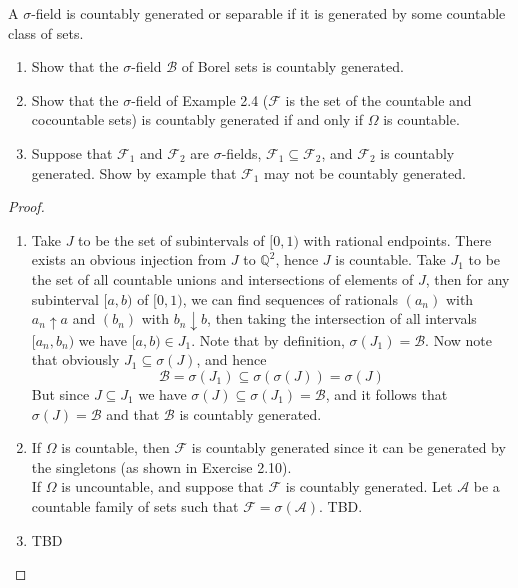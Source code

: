 \documentclass[12pt]{article}
\newcommand{\Q}{\mathbb{Q}}
\newcommand{\F}{\mathcal{F}}
\newcommand{\A}{\mathcal{A}}
\newcommand{\B}{\mathcal{B}}
\newcommand{\seq}{\subseteq}
\newcommand{\Om}{\Omega}
\newenvironment{exercise}[2][Exercise]{\begin{trivlist}
\item[\hskip \labelsep {\bfseries #1}\hskip \labelsep {\bfseries #2.}]}{\end{trivlist}}
\begin{document}
\begin{exercise}{2.11}
    A $\sigma$-field is countably generated or separable if it is generated by some countable class of sets.
    \begin{enumerate}
        \item Show that the $\sigma$-field $\B$ of Borel sets is countably generated.
        \item Show that the $\sigma$-field of Example 2.4 ($\F$ is the set of the countable and cocountable sets) is countably generated if and only if $\Om$ is countable.
        \item Suppose that $\F_1$ and $\F_2$ are $\sigma$-fields, $\F_1 \seq \F_2$, and $\F_2$ is countably generated. Show by example that $\F_1$ may not be countably generated.
    \end{enumerate}
\end{exercise}
\begin{proof}
    \begin{enumerate}
        \item Take $J$ to be the set of subintervals of $[0, 1)$ with rational endpoints. There exists an obvious injection from $J$ to $\Q^2$, hence $J$ is countable.  Take $J_1$ to be the set of all countable unions and intersections of elements of $J$, then for any subinterval $[a, b)$ of $[0, 1)$, we can find sequences of rationals $(a_n)$ with $a_n \uparrow a$ and $(b_n)$ with $b_n \downarrow b$, then taking the intersection of all intervals $[a_n, b_n)$ we have $[a, b) \in J_1$. Note that by definition, $\sigma (J_1) = \B$. Now note that obviously $J_1 \seq \sigma (J)$, and hence 
        \[ \B = \sigma (J_1) \seq \sigma (\sigma (J)) = \sigma (J) \]
        But since $J \seq J_1$ we have $\sigma (J) \seq \sigma (J_1) = \B$, and it follows that $\sigma (J) = \B$ and that $\B$ is countably generated.
        \item If $\Om$ is countable, then $\F$ is countably generated since it can be generated by the singletons (as shown in Exercise 2.10). \\
        If $\Om$ is uncountable, and suppose that $\F$ is countably generated. Let $\A$ be a countable family of sets such that $\F = \sigma (\A)$. TBD.
        \item TBD
    \end{enumerate}
\end{proof}
\end{document}
